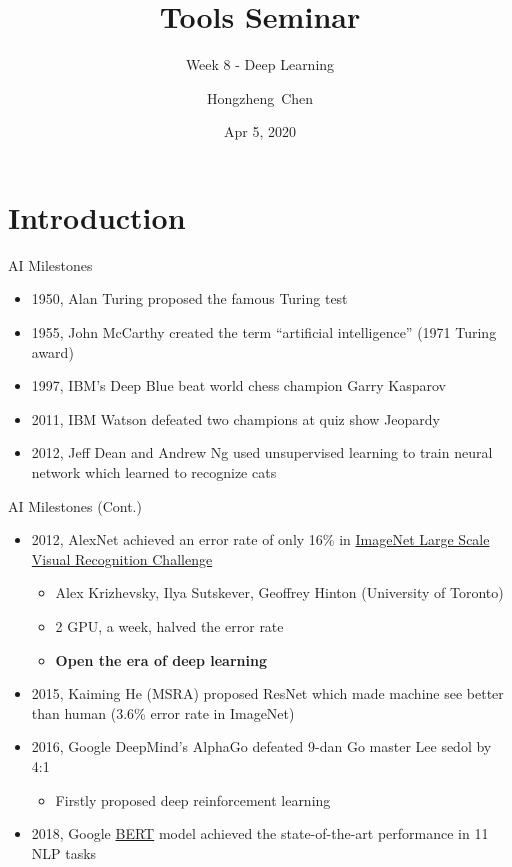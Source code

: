 \documentclass{../TexTemplate/myslide}
\title[ToolsSeminar]{Tools Seminar}
\subtitle{Week 8 - Deep Learning}
\author[chhzh123]{Hongzheng~Chen}
\date[Apr 5, 2020]{Apr 5, 2020}
\begin{document}
\begin{frame}
\titlepage
\end{frame}

\begin{frame}
\tableofcontents
\end{frame}

\section{Introduction}
\begin{frame}
\sectionpage
\end{frame}

\begin{frame}{AI Milestones}
\begin{itemize}[<+->]
\item 1950, Alan Turing proposed the famous Turing test
\item 1955, John McCarthy created the term ``artificial intelligence'' (1971 Turing award)
\item 1997, IBM's Deep Blue beat world chess champion Garry Kasparov
\item 2011, IBM Watson defeated two champions at quiz show Jeopardy
\item 2012, Jeff Dean and Andrew Ng used unsupervised learning to train neural network which learned to recognize cats
\end{itemize}
\end{frame}

\begin{frame}{AI Milestones (Cont.)}
\begin{itemize}[<+->]
\item 2012, AlexNet achieved an error rate of only 16\% in \href{http://image-net.org/challenges/LSVRC/2012/results.html}{ImageNet Large Scale Visual Recognition Challenge}
\begin{itemize}
	\item Alex Krizhevsky, Ilya Sutskever, Geoffrey Hinton (University of Toronto)
	\item 2 GPU, a week, halved the error rate
	\item \textbf{Open the era of deep learning}
\end{itemize}
\item 2015, Kaiming He (MSRA) proposed ResNet which made machine see better than human (3.6\% error rate in ImageNet)
\item 2016, Google DeepMind's AlphaGo defeated 9-dan Go master Lee sedol by 4:1
\begin{itemize}
	\item Firstly proposed deep reinforcement learning
\end{itemize}
\item 2018, Google \href{https://www.blog.google/products/search/search-language-understanding-bert/}{BERT} model achieved the state-of-the-art performance in 11 NLP tasks
\end{itemize}
\end{frame}
\end{document}
